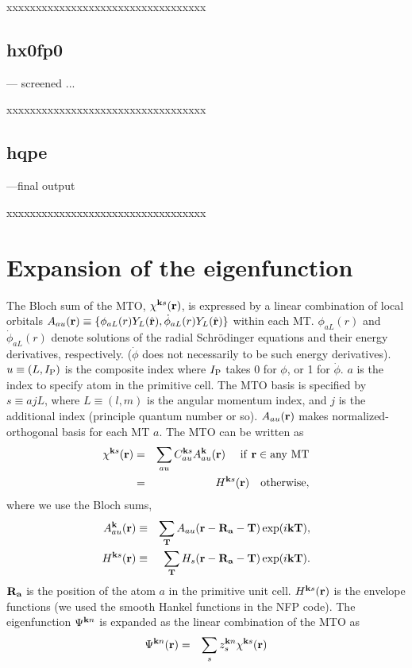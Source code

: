 \documentclass[a4paper,10pt,epsf,fleqn]{article}
\newcommand{\ssx}[1]{\subsection{\bf #1\index{\bf #1}}}
\begin{document}
{xxxxxxxxxxxxxxxxxxxxxxxxxxxxxxxxxx

\ssx{hx0fp0} --- screened ...

xxxxxxxxxxxxxxxxxxxxxxxxxxxxxxxxxx

\ssx{hqpe}---final output

xxxxxxxxxxxxxxxxxxxxxxxxxxxxxxxxxx


\newpage
\section{Expansion of the eigenfunction}
The Bloch sum of the MTO, $\chi^{{\bf k}s}({\bf r})$, is 
expressed by a linear combination of local orbitals
$A_{au}({\bf r})
\equiv \{ \phi_{aL}(r) Y_L(\hat{\bf r}),\dot{\phi}_{aL}(r) Y_L(\hat{\bf r}) \}$
within each MT.
$\phi_{aL}(r)$ and $\dot{\phi}_{aL}(r)$ denote solutions of
the radial Schr\"odinger equations and their energy derivatives, respectively.
($\dot{\phi}$ does not necessarily to be such energy derivatives).
$u \equiv(L, I_{\rm P})$ is the composite index
where $I_{\rm P}$ takes 0 for $\phi$, or 1 for $\dot{\phi}$.
$a$ is the index to specify atom in the primitive cell.
The MTO basis is specified by $s \equiv {ajL}$, where
$L\equiv(l,m)$ is the angular momentum index, and $j$ is the additional
index (principle quantum number or so). 
$A_{au}({\bf r})$ makes normalized-orthogonal basis for each MT $a$.
The MTO can be written as
\begin{eqnarray}
\label{coeff}
\chi^{{\bf k}s}({\bf r}) &=& \sum_{a u} C^{{\bf k}s}_{a u} A^{\bf k}_{a u}({\bf r})   \ \ \ {\rm \ if \ {\bf r} \in any \ MT} \nonumber \\
        &=&   H^{{\bf k}s}({\bf r}) \ \ \ {\rm otherwise},
\end{eqnarray}
where we use the Bloch sums,
\begin{eqnarray}
A^{\bf k}_{a u}({\bf r}) &\equiv& \sum_{\bf T} A_{a u}({\bf r-R_a-T}) \exp(i {\bf kT}), \\
H^{{\bf k}s}({\bf r})   &\equiv& \sum_{\bf T} H_{s}({\bf r-R_a-T}) \exp(i {\bf kT}).
\end{eqnarray}
${\bf R_a}$ is the position of the atom $a$ in the primitive unit cell.
$H^{{\bf k}s}({\bf r})$ is the envelope functions (we used the smooth Hankel functions in the NFP code).
The eigenfunction $\Psi^{{\bf k}n}$ is expanded as the linear combination of the MTO as
\begin{eqnarray}
\label{eigenfunction}
\Psi^{{\bf k}n}({\bf r}) &=& \sum_s z^{{\bf k}n}_s \chi^{{\bf k}s}({\bf r}) \\

\end{eqnarray}}
\end{document}
